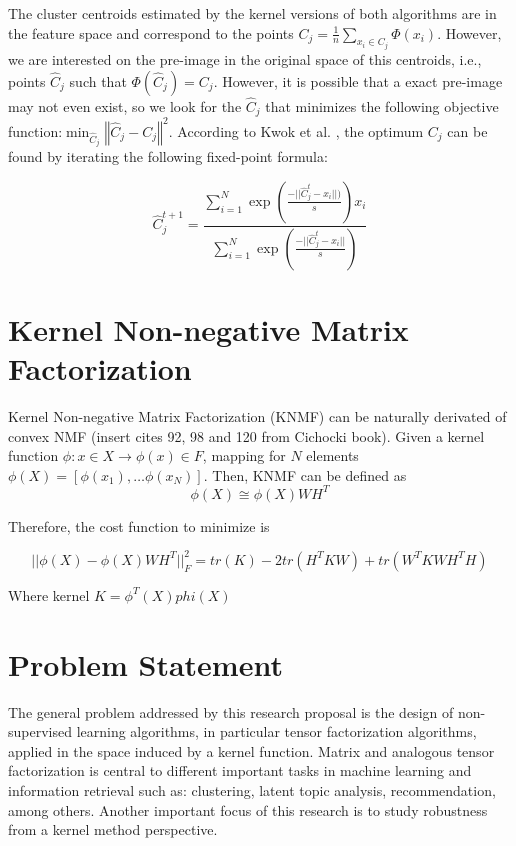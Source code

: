 \documentclass[letterpaper,12pt]{article}
\begin{document}
The cluster centroids estimated by the kernel versions of both algorithms are in the feature space and correspond to the points $C_{j}=\frac{1}{n}\sum_{x_{i}\in C_{j}}\Phi(x_{i})$. However, we are interested on the pre-image in the original space of this centroids, i.e., points $\hat{C}_{j}$ such that $\Phi(\hat{C}_{j})=C_{j}$. However, it is possible that a exact pre-image may not even exist, so we look for the $\hat{C}_{j}$ that minimizes the following objective function:$\min_{\hat{C}_{j}}\left\Vert \hat{C}_{j}-C_{j}\right\Vert ^{2}$. According to Kwok et al. \cite{kwok2004preimage}, the optimum $C_{j}$ can be found by iterating the following fixed-point formula:

\begin{equation}
\hat{C}_{j}^{t+1}=\frac{\sum_{i=1}^{N}\exp(\frac{-||\hat{C}_{j}^{t}-x_{i}||)}{s})x_{i}}{\sum_{i=1}^{N}\exp(\frac{-||\hat{C}_{j}^{t}-x_{i}||}{s})}\label{eq:back-projection}
\end{equation}


\section{Kernel Non-negative Matrix Factorization}

Kernel Non-negative Matrix Factorization (KNMF) can be naturally derivated of convex NMF (insert cites 92, 98 and 120 from Cichocki book). Given a kernel function $\phi:x\in X \rightarrow \phi(x)\in F $, mapping for $N$ elements $\phi(X) = [ \phi(x_1),\ldots \phi(x_N) ]$. Then, KNMF can be defined as
\begin{equation}
 \phi(X)\cong\phi(X)WH^T
\end{equation}\label{eq:KNMF}

Therefore, the cost function to minimize is

\begin{equation}
 || \phi(X) - \phi(X)WH^T ||_F^2 = tr(K) - 2 tr(H^TKW)+tr(W^TKWH^TH)
\end{equation}

 Where kernel $K=\phi^T(X)phi(X)$


\section{Problem Statement}

The general problem addressed by this research proposal is the design of non-supervised learning algorithms, in particular tensor factorization algorithms, applied in the space induced by a kernel function. Matrix and analogous tensor factorization is central to different important tasks in machine learning and information retrieval such as: clustering, latent topic analysis, recommendation, among others. Another important focus of this research is to study robustness from a kernel method perspective. 
\end{document}
